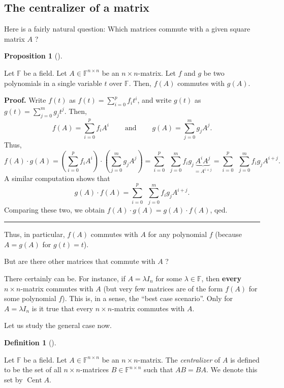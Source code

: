 \documentclass[numbers=enddot,12pt,final,onecolumn,notitlepage]{scrartcl}%
\numberwithin{exer}{subsection}
\theoremstyle{definition}
\newtheorem{prop}[theo]{Proposition}
\newenvironment{proposition}[1][]
{\begin{prop}[#1]\begin{leftbar}}
{\end{leftbar}\end{prop}}
\newtheorem{defi}[theo]{Definition}
\newenvironment{definition}[1][]
{\begin{defi}[#1]\begin{leftbar}}
{\end{leftbar}\end{defi}}
\newenvironment{proof}[1][Proof]{\noindent\textbf{#1.} }{\ \rule{0.5em}{0.5em}}
\let\sumnonlimits\sum
\renewcommand{\sum}{\sumnonlimits\limits}
\begin{document}
\subsection{The centralizer of a matrix}

Here is a fairly natural question: Which matrices commute with a given square
matrix $A$ ?

\begin{proposition}
Let $\mathbb{F}$ be a field. Let $A\in\mathbb{F}^{n\times n}$ be an $n\times
n$-matrix. Let $f$ and $g$ be two polynomials in a single variable $t$ over
$\mathbb{F}$. Then, $f\left(  A\right)  $ commutes with $g\left(  A\right)  $.
\end{proposition}

\begin{proof}
Write $f\left(  t\right)  $ as $f\left(  t\right)  =\sum_{i=0}^{p}f_{i}t^{i}$,
and write $g\left(  t\right)  $ as $g\left(  t\right)  =\sum_{j=0}^{m}%
g_{j}t^{j}$. Then,%
\[
f\left(  A\right)  =\sum_{i=0}^{p}f_{i}A^{i}\ \ \ \ \ \ \ \ \ \ \text{and}%
\ \ \ \ \ \ \ \ \ \ g\left(  A\right)  =\sum_{j=0}^{m}g_{j}A^{j}.
\]
Thus,%
\[
f\left(  A\right)  \cdot g\left(  A\right)  =\left(  \sum_{i=0}^{p}f_{i}%
A^{i}\right)  \cdot\left(  \sum_{j=0}^{m}g_{j}A^{j}\right)  =\sum_{i=0}%
^{p}\ \ \sum_{j=0}^{m}f_{i}g_{j}\underbrace{A^{i}A^{j}}_{=A^{i+j}}=\sum
_{i=0}^{p}\ \ \sum_{j=0}^{m}f_{i}g_{j}A^{i+j}.
\]
A similar computation shows that%
\[
g\left(  A\right)  \cdot f\left(  A\right)  =\sum_{i=0}^{p}\ \ \sum_{j=0}%
^{m}f_{i}g_{j}A^{i+j}.
\]
Comparing these two, we obtain $f\left(  A\right)  \cdot g\left(  A\right)
=g\left(  A\right)  \cdot f\left(  A\right)  $, qed.
\end{proof}

Thus, in particular, $f\left(  A\right)  $ commutes with $A$ for any
polynomial $f$ (because $A=g\left(  A\right)  $ for $g\left(  t\right)  =t$).

But are there other matrices that commute with $A$ ?

There certainly can be. For instance, if $A=\lambda I_{n}$ for some
$\lambda\in\mathbb{F}$, then \textbf{every} $n\times n$-matrix commutes with
$A$ (but very few matrices are of the form $f\left(  A\right)  $ for some
polynomial $f$). This is, in a sense, the \textquotedblleft best case
scenario\textquotedblright. Only for $A=\lambda I_{n}$ is it true that every
$n\times n$-matrix commutes with $A$.

Let us study the general case now.

\begin{definition}
Let $\mathbb{F}$ be a field. Let $A\in\mathbb{F}^{n\times n}$ be an $n\times
n$-matrix. The \emph{centralizer} of $A$ is defined to be the set of all
$n\times n$-matrices $B\in\mathbb{F}^{n\times n}$ such that $AB=BA$. We denote
this set by $\operatorname*{Cent}A$.
\end{definition}
\end{document}
